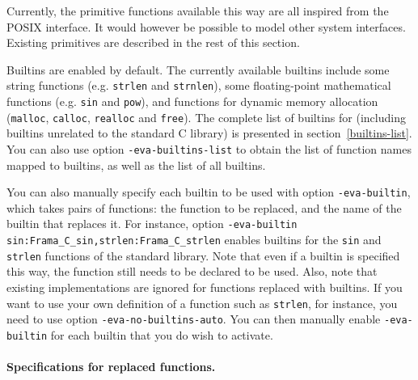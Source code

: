 \documentclass{frama-c-book}
\begin{document}
Currently, the primitive functions available this way are all inspired
from the \mbox{POSIX} interface. It would however be possible to model
other system interfaces. Existing primitives are described in the rest
of this section.

Builtins are enabled by default. The currently available builtins include
some string functions (e.g. \lstinline|strlen| and \lstinline|strnlen|),
some floating-point mathematical functions (e.g. \lstinline|sin| and
\lstinline|pow|), and functions for dynamic memory allocation
(\lstinline|malloc|, \lstinline|calloc|, \lstinline|realloc| and
\lstinline|free|).
%
The complete list of builtins for \Eva{} (including builtins
unrelated to the standard C library) is presented in
section~\ref{builtins-list}.
%
You can also use option \lstinline|-eva-builtins-list| to obtain the list of
function names mapped to builtins, as well as the list of all builtins.

You can also manually specify each builtin to be used with option
\lstinline|-eva-builtin|, which takes pairs of functions:
the function to be replaced, and the name of the builtin that replaces it.
For instance, option
\lstinline|-eva-builtin sin:Frama_C_sin,strlen:Frama_C_strlen| enables
builtins for the \lstinline|sin| and \lstinline|strlen| functions of the
standard library. Note that even if a builtin is specified this way,
the function still needs to be declared to be used.
%
Also, note that existing implementations are ignored
for functions replaced with builtins. If you want \Eva{} to use your own definition
of a function such as \lstinline|strlen|, for instance, you need to use option
\lstinline|-eva-no-builtins-auto|. You can then manually enable
\lstinline|-eva-builtin| for each builtin that you do wish to activate.

\paragraph{Specifications for replaced functions.}
\end{document}
